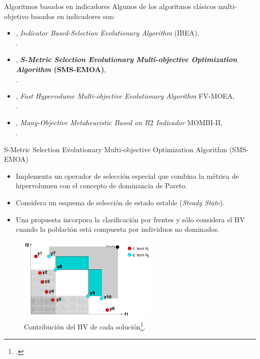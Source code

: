 \documentclass{beamer}
\begin{document}
\begin{frame}{Algoritmos basados en indicadores}
Algunos de los algoritmos clásicos multi-objetivo basados en indicadores son:
\begin{itemize}
\scriptsize
   \item \citeyear{Joel:IBEA}, \textit{Indicator Based-Selection Evolutionary Algorithm } (IBEA), \\ \citeauthor{Joel:IBEA}.
   \item \citeyear{Joel:SMSEMOA}, \textbf{\textit{S-Metric Selection Evolutionary Multi-objective Optimization Algorithm} (SMS-EMOA)}, \\ \citeauthor{Joel:SMSEMOA}.
   \item \citeyear{Joel:FV-MOEA}, \textit{Fast Hypervolume Multi-objective Evolutionary Algorithm} FV-MOEA, \\ \citeauthor{Joel:FV-MOEA}.
   \item \citeyear{Joel:MOMBI-II}, \textit{Many-Objective Metaheuristic Based on $R2$ Indicador} MOMBI-II, \\ \citeauthor{Joel:MOMBI-II}.
\end{itemize}
\end{frame}



\begin{frame}{S-Metric Selection Evolutionary Multi-objective Optimization Algorithm (SMS-EMOA)}
\begin{itemize}
\scriptsize
\item Implementa un operador de selección especial que combina la métrica de hipervolumen con el concepto de dominancia de Pareto.
%
\item Considera un esquema de selección de estado estable (\textit{Steady State}).
\item Una propuesta incorpora la clasificación por frentes y sólo considera el HV cuando la población está compuesta por individuos no dominados.
\end{itemize}
\begin{figure}[H]
\centering
\includegraphics[width=0.6\textwidth]{sms_emoa.png}
\caption{\scriptsize Contribución del HV de cada solución\footcite{Joel:SMSEMOA}.}
\end{figure}
\end{frame}
\end{document}
